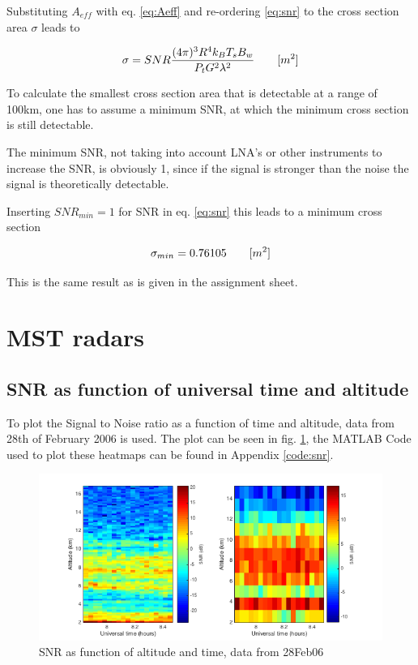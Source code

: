 Substituting $A_{eff}$ with eq. \ref{eq:Aeff} and re-ordering \ref{eq:snr} to the cross section area $\sigma$ leads to

\begin{equation}
\label{eq:snr}
	\centering
	\sigma = {SNR} \frac{(4 \pi)^3 R^4 k_B T_s B_w}{P_t G^2 \lambda^2}	\qquad [m^2]
\end{equation}

To calculate the smallest cross section area that is detectable at a range of 100km, one has to assume a minimum SNR, at which the minimum cross section is still detectable.

The minimum SNR, not taking into account LNA's or other instruments to increase the SNR, is obviously 1, since if the signal is stronger than the noise the signal is theoretically detectable.

Inserting $SNR_{min} = 1$ for SNR in eq. \ref{eq:snr} this leads to a minimum cross section

\begin{equation}
\label{eq:crossSecResult}
	\centering
	\sigma_{min} = 0.76105 \qquad [m^2]	
\end{equation}

This is the same result as is given in the assignment sheet.


\section{MST radars}

\subsection{SNR as function of universal time and altitude}
To plot the Signal to Noise ratio as a function of time and altitude, data from 28th of February 2006 is used. The plot can be seen in fig. \ref{img:snrPlot}, the MATLAB Code used to plot these heatmaps can be found in Appendix \ref{code:snr}.

\begin{figure}
	\centering
	\label{img:snrPlot}
	\includegraphics[width=\textwidth]{images/task4_plot1}
	\caption{SNR as function of altitude and time, data from 28Feb06}
\end{figure}


